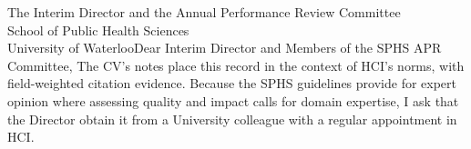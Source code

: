 \begin{aprletter}{%
The Interim Director and the Annual Performance Review Committee\\
School of Public Health Sciences\\
University of Waterloo}{Dear Interim Director and Members of the SPHS APR Committee,}
The CV's notes place this record in the context of HCI's norms, with field-weighted citation evidence. Because the SPHS guidelines provide for expert opinion where assessing quality and impact calls for domain expertise, I ask that the Director obtain it from a University colleague with a regular appointment in HCI.

\end{aprletter}
